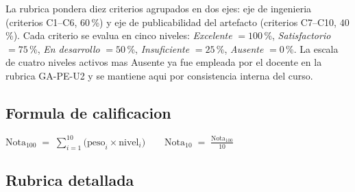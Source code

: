 \documentclass[11pt,a4paper]{article}
\begin{document}
La rubrica pondera diez criterios agrupados en dos ejes: eje de ingenieria (criterios C1--C6, $60$\,\%) y eje de publicabilidad del artefacto (criterios C7--C10, $40$\,\%). Cada criterio se evalua en cinco niveles: \emph{Excelente} $= 100$\,\%, \emph{Satisfactorio} $= 75$\,\%, \emph{En desarrollo} $= 50$\,\%, \emph{Insuficiente} $= 25$\,\%, \emph{Ausente} $= 0$\,\%. La escala de cuatro niveles activos mas Ausente ya fue empleada por el docente en la rubrica GA-PE-U2 y se mantiene aqui por consistencia interna del curso.

\subsection{Formula de calificacion}

\begin{center}
$\displaystyle \text{Nota}_{100} \;=\; \sum_{i=1}^{10} \bigl(\text{peso}_{i} \times \text{nivel}_{i}\bigr) \qquad \text{Nota}_{10} \;=\; \frac{\text{Nota}_{100}}{10}$
\end{center}

\subsection{Rubrica detallada}
\end{document}
